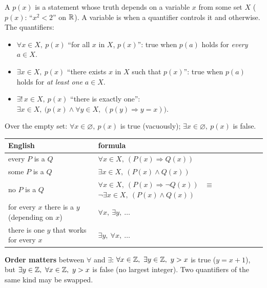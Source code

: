 
\begin{key}
A  $p(x)$ is a statement whose truth depends on a variable $x$ from some set $X$ (\eg $p(x)$: ``$x^2<2$'' on $\mathbb{R}$). A variable is  when a quantifier controls it and  otherwise. The quantifiers:
\begin{itemize}
\item $\forall x\in X,\ p(x)$ \quad ``for all $x$ in $X$, $p(x)$'': true when $p(a)$ holds for \emph{every} $a\in X$.
\item $\exists x\in X,\ p(x)$ \quad ``there exists $x$ in $X$ such that $p(x)$'': true when $p(a)$ holds for \emph{at least one} $a\in X$.
\item $\exists!\,x\in X,\ p(x)$ \quad ``there is exactly one'': $\exists x\in X,\ \big(p(x)\wedge\forall y\in X,\ (p(y)\Rightarrow y=x)\big)$.
\end{itemize}
Over the empty set: $\forall x\in\varnothing,\ p(x)$ is true (vacuously); $\exists x\in\varnothing,\ p(x)$ is false.
\end{key}

\begin{key}
\begin{center}\small
\begin{tabular}{@{}l l@{}}
\toprule
English & formula\\
\midrule
every $P$ is a $Q$ & $\forall x\in X,\ (P(x)\Rightarrow Q(x))$\\
some $P$ is a $Q$ & $\exists x\in X,\ (P(x)\wedge Q(x))$\\
no $P$ is a $Q$ & $\forall x\in X,\ (P(x)\Rightarrow\neg Q(x))$ \ $\equiv$ \ $\neg\exists x\in X,\ (P(x)\wedge Q(x))$\\
for every $x$ there is a $y$ (depending on $x$) & $\forall x,\ \exists y,\ \dots$\\
there is one $y$ that works for every $x$ & $\exists y,\ \forall x,\ \dots$\\
\bottomrule
\end{tabular}
\end{center}
\textbf{Order matters} between $\forall$ and $\exists$: $\forall x\in\Z,\ \exists y\in\Z,\ y>x$ is true ($y=x+1$), but $\exists y\in\Z,\ \forall x\in\Z,\ y>x$ is false (no largest integer). Two quantifiers of the same kind may be swapped.
\end{key}

